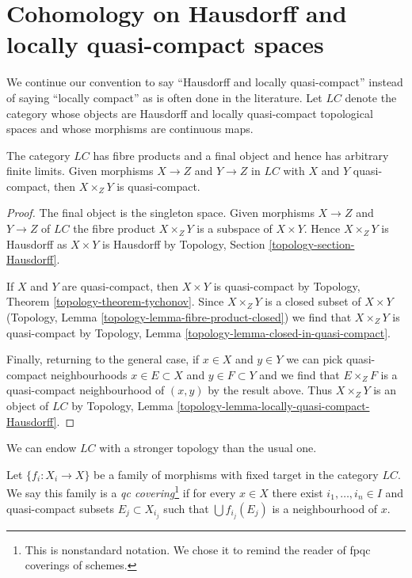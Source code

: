 \section{Cohomology on Hausdorff and locally quasi-compact spaces}
\label{section-cohomology-LC}

\noindent
We continue our convention to say ``Hausdorff and locally quasi-compact''
instead of saying ``locally compact'' as is often done in the literature.
Let $\textit{LC}$ denote the category whose objects are Hausdorff and
locally quasi-compact topological spaces and whose morphisms are continuous
maps.

\begin{lemma}
\label{lemma-LC-basic}
The category $\textit{LC}$ has fibre products and a final object and hence
has arbitrary finite limits. Given morphisms $X \to Z$ and $Y \to Z$
in $\textit{LC}$ with
$X$ and $Y$ quasi-compact, then $X \times_Z Y$ is quasi-compact.
\end{lemma}

\begin{proof}
The final object is the singleton space. Given morphisms $X \to Z$ and
$Y \to Z$ of $\textit{LC}$ the fibre product $X \times_Z Y$ is
a subspace of $X \times Y$. Hence $X \times_Z Y$ is Hausdorff as
$X \times Y$ is Hausdorff by
Topology, Section \ref{topology-section-Hausdorff}.

\medskip\noindent
If $X$ and $Y$ are quasi-compact, then $X \times Y$ is quasi-compact by 
Topology, Theorem \ref{topology-theorem-tychonov}.
Since $X \times_Z Y$ is a closed subset of $X \times Y$
(Topology, Lemma \ref{topology-lemma-fibre-product-closed})
we find that $X \times_Z Y$ is quasi-compact by
Topology, Lemma \ref{topology-lemma-closed-in-quasi-compact}.

\medskip\noindent
Finally, returning to the general case, if $x \in X$ and $y \in Y$
we can pick quasi-compact neighbourhoods $x \in E \subset X$ and
$y \in F \subset Y$ and we find that $E \times_Z F$ is a quasi-compact
neighbourhood of $(x, y)$ by the result above. Thus $X \times_Z Y$
is an object of $\textit{LC}$ by
Topology, Lemma \ref{topology-lemma-locally-quasi-compact-Hausdorff}.
\end{proof}

\noindent
We can endow $\textit{LC}$ with a stronger topology than the usual one.

\begin{definition}
\label{definition-covering-LC}
Let $\{f_i : X_i \to X\}$ be a family of morphisms with fixed target
in the category $\textit{LC}$. We say this family is a
{\it qc covering}\footnote{This is nonstandard notation.
We chose it to remind the reader of fpqc coverings of schemes.}
if for every $x \in X$ there exist $i_1, \ldots, i_n \in I$ and
quasi-compact subsets $E_j \subset X_{i_j}$ such that
$\bigcup f_{i_j}(E_j)$ is a neighbourhood of $x$.
\end{definition}

